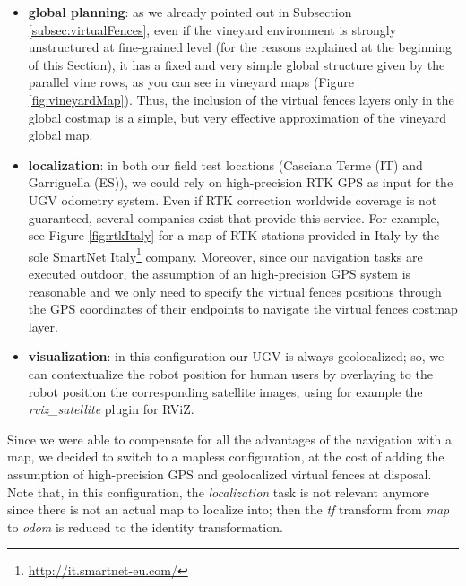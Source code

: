 \begin{itemize}
	\item \textbf{global planning}: as we already pointed out in Subsection \ref{subsec:virtualFences}, even if the vineyard environment is strongly unstructured at fine-grained level (for the reasons explained at the beginning of this Section), it has a fixed and very simple global structure given by the parallel vine rows, as you can see in vineyard maps (Figure \ref{fig:vineyardMap}). Thus, the inclusion of the virtual fences layers only in the global costmap is a simple, but very effective approximation of the vineyard global map.
	\item \textbf{localization}: in both our field test locations (Casciana Terme (IT) and Garriguella (ES)), we could rely on high-precision RTK GPS \parencite{rtk} as input for the \ac{UGV} odometry system. Even if RTK correction worldwide coverage is not guaranteed, several companies exist that provide this service. For example, see Figure \ref{fig:rtkItaly} for a map of RTK stations provided in Italy by the sole SmartNet Italy\footnote{\url{http://it.smartnet-eu.com/}}
company. Moreover, since our navigation tasks are executed outdoor, the assumption of an high-precision GPS system is reasonable and we only need to specify the virtual fences positions through the GPS coordinates of their endpoints to navigate the virtual fences costmap layer.
	\item \textbf{visualization}: in this configuration our \ac{UGV} is always geolocalized; so, we can contextualize the robot position for human users by overlaying to the robot position the corresponding satellite images, using for example the \textit{rviz\_satellite} plugin for RViZ.
\end{itemize}
Since we were able to compensate for all the advantages of the navigation with a map, we decided to switch to a mapless configuration, at the cost of adding the assumption of high-precision GPS and geolocalized virtual fences at disposal. Note that, in this configuration, the \textit{localization} task is not relevant anymore since there is not an actual map to localize into; then the \textit{tf} transform from \textit{map} to \textit{odom} is reduced to the identity transformation.


